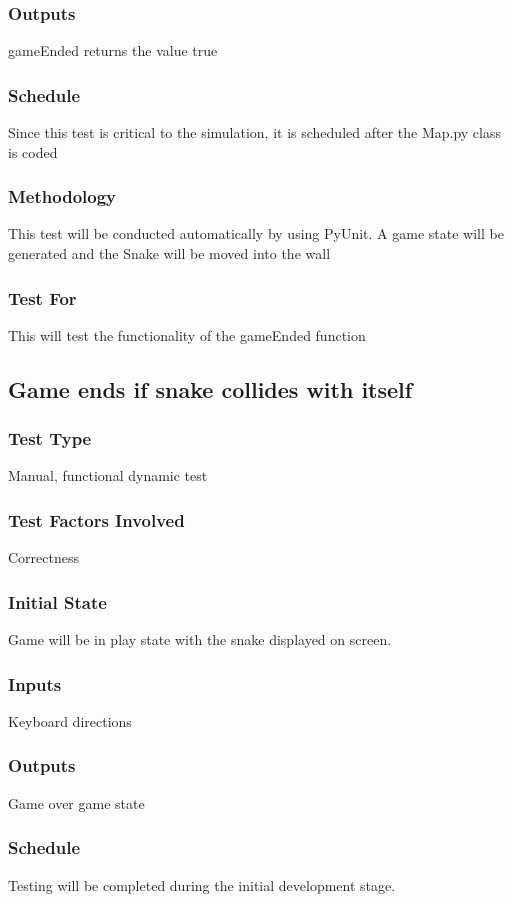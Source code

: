 \documentclass[12pt]{article}
\begin{document}
\subsubsection*{Outputs}
gameEnded returns the value true
\subsubsection*{Schedule}
Since this test is critical to the simulation, it is scheduled after the Map.py class is coded
\subsubsection*{Methodology}
This test will be conducted automatically by using PyUnit. A game state will be generated and the Snake will be moved into the wall
\subsubsection*{Test For}
This will test the functionality of the gameEnded function \newline

\noindent
\subsection{Game ends if snake collides with itself}
\subsubsection*{Test Type}
Manual, functional dynamic test
\subsubsection*{Test Factors Involved}
Correctness
\subsubsection*{Initial State}
Game will be in play state with the snake displayed on screen.
\subsubsection*{Inputs}
Keyboard directions
\subsubsection*{Outputs}
Game over game state
\subsubsection*{Schedule}
Testing will be completed during the initial development stage.
\end{document}

